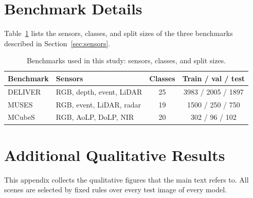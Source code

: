 \appendices
\let\origFloatBarrier\FloatBarrier\renewcommand{\FloatBarrier}{}\setcounter{dbltopnumber}{2}\renewcommand{\dbltopfraction}{0.95}\renewcommand{\floatpagefraction}{0.6}\renewcommand{\dblfloatpagefraction}{0.6}%
\section{Benchmark Details}
\label{app:bench}
Table~\ref{tab:benchmarks} lists the sensors, classes, and split sizes of the three benchmarks described in Section~\ref{sec:sensors}.

\begin{table}[t]
\caption{Benchmarks used in this study: sensors, classes, and split sizes.}
\label{tab:benchmarks}
\centering\tabsetup
\begin{tabular*}{\columnwidth}{@{\extracolsep{\fill}}llcc@{}}
\toprule
Benchmark & Sensors & Classes & Train / val / test \\
\midrule
DELIVER~\cite{cmnext2023} & RGB, depth, event, LiDAR & 25 & 3983 / 2005 / 1897 \\
MUSES~\cite{muses2024} & RGB, event, LiDAR, radar & 19 & 1500 / 250 / 750 \\
MCubeS~\cite{mcubes2022} & RGB, AoLP, DoLP, NIR & 20 & 302 / 96 / 102 \\
\bottomrule
\end{tabular*}
\end{table}

\section{Additional Qualitative Results}
\label{app:qual}
This appendix collects the qualitative figures that the main text refers to. All scenes are selected by fixed rules over every test image of every model.

